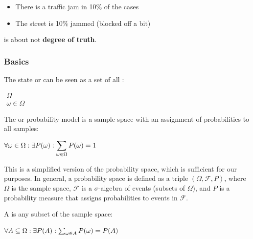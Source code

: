 \documentclass[
../EiKI_Summary.tex,
]
{subfiles}
\begin{document}
\begin{itemize}
    \item {} There is a traffic jam in 10\% of the cases
    \item {} The street is 10\% jammed (blocked off a bit) 
\end{itemize}

 is about  not \textbf{degree of truth}.

\subsubsection{Basics}
The state or  can be seen as a set of all :

\begin{csmb*}
    $\substack{\displaystyle\Omega\\ \displaystyle{\omega \in \Omega}}$
\end{csmb*}

The  or probability model is a sample space with an assignment of probabilities to all samples:

\begin{csmb*}
    $\displaystyle \forall \omega \in \Omega: \space\space \exists P(\omega):\space\space
    \sum_{\omega \in \Omega} P(\omega) = 1$
\end{csmb*}

This is a simplified version of the probability space, which is sufficient for our purposes. In general, a probability space is defined as a triple $(\Omega, \mathcal{F}, P)$, where $\Omega$ is the sample space, $\mathcal{F}$ is a $\sigma$-algebra of events (subsets of $\Omega$), and $P$ is a probability measure that assigns probabilities to events in $\mathcal{F}$.

 A is any subset of the sample space:

\begin{csmb*}
    $\forall A \subseteq \Omega: \space\space \exists P(A): \space\space \sum_{\omega \in A} P(\omega) = P(A)$
\end{csmb*}
\end{document}
